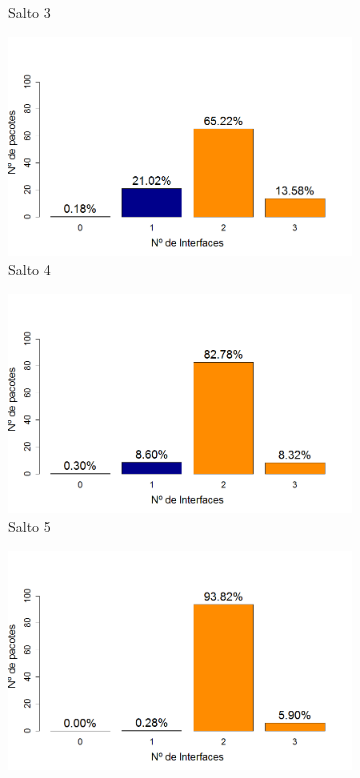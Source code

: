 \documentclass[
	12pt,				%
	openright,			%
	oneside,
	a4paper,			%
	english,			%
	french,				%
	spanish,			%
	brazil				%
	]{abntex2}
\begin{document}
\begin{figure}[tb]
\begin{subfigure}{.5\textwidth}
		\captionsetup{width=.9\textwidth}
		\caption{Salto 3}
		\label{dpr_no_opt_s3}
	\end{subfigure}%
	\begin{subfigure}{.5\textwidth}
		\centering
		\includegraphics[width=.98\linewidth]{DRP_Salto4}
		\captionsetup{width=.9\textwidth}
		\caption{Salto 4}
		\label{dpr_no_opt_s4}
	\end{subfigure}
	\begin{subfigure}{.5\textwidth}
		\centering
		\includegraphics[width=.98\linewidth]{DRP_Salto5}
		\captionsetup{width=.9\textwidth}
		\caption{Salto 5}
		\label{dpr_no_opt_s5}
	\end{subfigure}%
	\begin{subfigure}{.5\textwidth}
		\centering
		\includegraphics[width=.98\linewidth]{DRP_Salto6}

\end{subfigure}
\end{figure}
\end{document}
